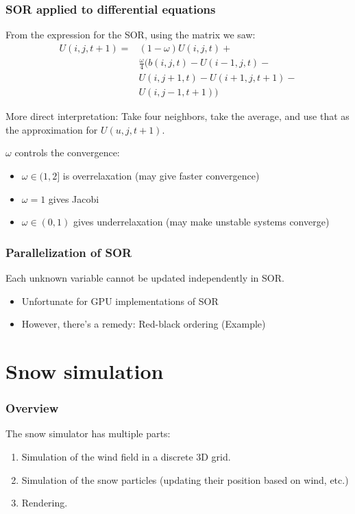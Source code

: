 \begin{frame}
\frametitle{SOR applied to differential equations}
From the expression for the SOR, using the matrix we saw:
$$
\begin{array}{ll}
U(i,j,t+1) = & (1-\omega)U(i,j,t) + \\
             & \frac{\omega}{4} (b(i,j,t) -  U(i-1,j,t) - \\
             & U(i,j+1,t) - U(i+1,j,t+1) - \\
             & U(i,j-1,t+1))
\end{array}
$$

More direct interpretation: Take four neighbors, take the average, and use that as the approximation for $U(u,j,t+1)$.

$\omega$ controls the convergence: 
\begin{itemize}
\item $\omega \in (1, 2]$ is overrelaxation (may give faster convergence)
\item $\omega = 1$ gives Jacobi
\item $\omega \in (0,1)$ gives underrelaxation (may make unstable systems converge)
\end{itemize}
\end{frame}

\begin{frame}
\frametitle{Parallelization of SOR}
Each unknown variable cannot be updated independently in SOR.
\begin{itemize}
\item Unfortunate for GPU implementations of SOR
\item However, there's a remedy: Red-black ordering (Example)
\end{itemize}
\end{frame}

\section{Snow simulation}
\begin{frame}
\frametitle{Overview}
The snow simulator has multiple parts:
\begin{enumerate}
\item Simulation of the wind field in a discrete 3D grid.
\item Simulation of the snow particles (updating their position based on wind, etc.)
\item Rendering.
\end{enumerate}
\end{frame}

